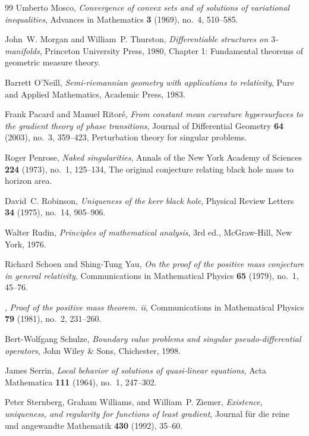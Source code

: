 \documentclass[12pt]{article}
\theoremstyle{plain}
\theoremstyle{definition}
\theoremstyle{remark}
\begin{document}
\begin{thebibliography}{99}
Umberto Mosco, \emph{Convergence of convex sets and of solutions of variational
  inequalities}, Advances in Mathematics \textbf{3} (1969), no.~4, 510--585.

John~W. Morgan and William~P. Thurston, \emph{Differentiable structures on $3$-manifolds}, Princeton University Press, 1980, Chapter 1: Fundamental theorems of geometric measure theory.

Barrett O'Neill, \emph{Semi-riemannian geometry with applications to
  relativity}, Pure and Applied Mathematics, Academic Press, 1983.

Frank Pacard and Manuel Ritor\'e, \emph{From constant mean curvature
  hypersurfaces to the gradient theory of phase transitions}, Journal of
  Differential Geometry \textbf{64} (2003), no.~3, 359--423, Perturbation
  theory for singular problems.

Roger Penrose, \emph{Naked singularities}, Annals of the New York Academy of
  Sciences \textbf{224} (1973), no.~1, 125--134, The original conjecture
  relating black hole mass to horizon area.

David~C. Robinson, \emph{Uniqueness of the kerr black hole}, Physical Review
  Letters \textbf{34} (1975), no.~14, 905--906.

Walter Rudin, \emph{Principles of mathematical analysis}, 3rd ed., McGraw-Hill, New York, 1976.

Richard Schoen and Shing-Tung Yau, \emph{On the proof of the positive mass
  conjecture in general relativity}, Communications in Mathematical Physics
  \textbf{65} (1979), no.~1, 45--76.

\bysame, \emph{Proof of the positive mass theorem. ii}, Communications in
  Mathematical Physics \textbf{79} (1981), no.~2, 231--260.

Bert-Wolfgang Schulze, \emph{Boundary value problems and singular pseudo-differential operators}, John Wiley \& Sons, Chichester, 1998.

James Serrin, \emph{Local behavior of solutions of quasi-linear equations},
  Acta Mathematica \textbf{111} (1964), no.~1, 247--302.

Peter Sternberg, Graham Williams, and William~P. Ziemer, \emph{Existence,
  uniqueness, and regularity for functions of least gradient}, Journal f\"ur
  die reine und angewandte Mathematik \textbf{430} (1992), 35--60.


\end{thebibliography}
\end{document}
